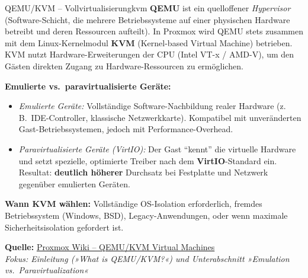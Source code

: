\documentclass[a4paper,10pt,addpoints]{exam}
\begin{document}
\begin{infoBox}{QEMU/KVM -- Vollvirtualisierung}{kvm}
  \textbf{QEMU} ist ein quelloffener \emph{Hypervisor} (Software-Schicht, die mehrere
  Betriebssysteme auf einer physischen Hardware betreibt und deren Ressourcen aufteilt).
  In Proxmox wird QEMU stets zusammen mit dem Linux-Kernelmodul \textbf{KVM}
  (Kernel-based Virtual Machine) betrieben.
  KVM nutzt Hardware-Erweiterungen der CPU (Intel VT-x / AMD-V), um den Gästen
  direkten Zugang zu Hardware-Ressourcen zu ermöglichen.

  \medskip
  \textbf{Emulierte vs.\ paravirtualisierte Geräte:}
  \begin{itemize}
    \item \emph{Emulierte Geräte:} Vollständige Software-Nachbildung realer Hardware
      (z.\,B.\ IDE-Controller, klassische Netzwerkkarte). Kompatibel mit unveränderten
      Gast-Betriebssystemen, jedoch mit Performance-Overhead.
    \item \emph{Paravirtualisierte Geräte (VirtIO):} Der Gast \enquote{kennt} die
      virtuelle Hardware und setzt spezielle, optimierte Treiber nach dem
      \textbf{VirtIO}-Standard ein. Resultat: \textbf{deutlich höherer}
      Durchsatz bei Festplatte und Netzwerk gegenüber emulierten Geräten.
  \end{itemize}

  \medskip
  \textbf{Wann KVM wählen:} Vollständige OS-Isolation erforderlich, fremdes
  Betriebssystem (Windows, BSD), Legacy-Anwendungen, oder wenn maximale
  Sicherheitsisolation gefordert ist.

  \medskip\small
  \textbf{Quelle:} \href{https://pve.proxmox.com/wiki/Qemu/KVM_Virtual_Machines}{Proxmox Wiki -- QEMU/KVM Virtual Machines}\\
  \hspace*{0.4em}\textit{Fokus: Einleitung (»What is QEMU/KVM?«) und
    Unterabschnitt »Emulation vs.\ Paravirtualization«}
\end{infoBox}
\end{document}

